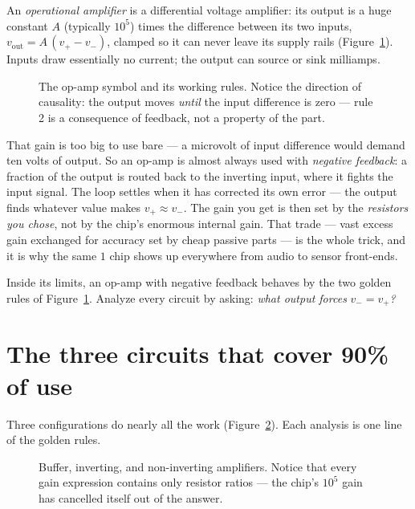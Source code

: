 An \emph{operational amplifier} is a differential voltage
amplifier: its output is a huge constant $A$ (typically $10^{5}$) times
the difference between its two inputs, $v_{\mathrm{out}} = A\,(v_+ - v_-)$,
clamped so it can never leave its supply rails
(Figure~\ref{fig:opamp}). Inputs draw
essentially no current; the output can source or sink milliamps.

\begin{figure}[htbp]
\centering

\caption{The op-amp symbol and its working rules. Notice the direction of
causality: the output moves \emph{until} the input difference is zero —
rule 2 is a consequence of feedback, not a property of the part.}
\label{fig:opamp}
\end{figure}

That gain is too big to use bare — a microvolt of input difference would
demand ten volts of output. So an op-amp is almost always used with
\emph{negative feedback}: a fraction of the
output is routed back to the inverting input, where it fights the input
signal. The loop settles when it has corrected its own error — the output
finds whatever value makes $v_+ \approx v_-$. The gain you get is then set
by the \emph{resistors you chose}, not by the chip's enormous internal
gain. That trade — vast excess gain exchanged for accuracy set by cheap
passive parts — is the whole trick, and it is why the same $1$ chip shows
up everywhere from audio to sensor front-ends.

\begin{checkpoint}
Inside its limits, an op-amp with negative feedback behaves by the two
golden rules of Figure~\ref{fig:opamp}. Analyze every circuit by asking:
\emph{what output forces }$v_- = v_+$\emph{?}
\end{checkpoint}

\section{The three circuits that cover 90\% of use}
\label{sec:three}

Three configurations do nearly all the work (Figure~\ref{fig:configs}).
Each analysis is one line of the golden rules.

\begin{figure}[htbp]
\centering

\caption{Buffer, inverting, and non-inverting amplifiers. Notice that
every gain expression contains only resistor ratios — the chip's
$10^{5}$ gain has cancelled itself out of the answer.}
\label{fig:configs}
\end{figure}

